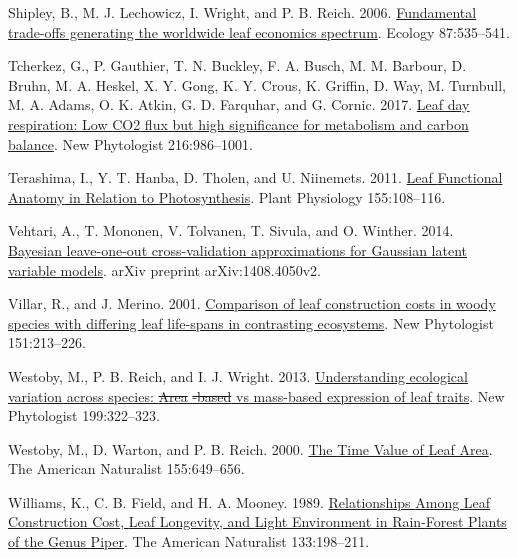 \documentclass[
  12pt,
]{article}
\newlength{\cslhangindent} %
\newlength{\cslentryspacingunit} %
\newenvironment{CSLReferences}[2] %
 {%
  \setlength{\parindent}{0pt} %
  \ifodd #1 %
  \let\oldpar\par %
  \def\par{\hangindent=\cslhangindent\oldpar} %
  \fi %
  \setlength{\parskip}{#2\cslentryspacingunit} %
 }%
 {} %
\providecommand{\DIFaddtex}[1]{{\protect\color{blue}\uwave{#1}}} %
\providecommand{\DIFdeltex}[1]{{\protect\color{red}\sout{#1}}}                      %
\providecommand{\DIFaddbegin}{} %
\providecommand{\DIFaddend}{} %
\providecommand{\DIFdelbegin}{} %
\providecommand{\DIFdelend}{} %
\providecommand{\DIFadd}[1]{\texorpdfstring{\DIFaddtex{#1}}{#1}} %
\providecommand{\DIFdel}[1]{\texorpdfstring{\DIFdeltex{#1}}{}} %
\newcommand{\DIFscaledelfig}{0.5}
\newlength{\DIFdelgraphicswidth} %
\newlength{\DIFdelgraphicsheight} %
\newcommand{\DIFaddincludegraphics}[2][]{{\color{blue}\fbox{\DIFOincludegraphics[#1]{#2}}}} %
\newcommand{\DIFdelincludegraphics}[2][]{%
\sbox{\DIFdelgraphicsbox}{\DIFOincludegraphics[#1]{#2}}%
\settoboxwidth{\DIFdelgraphicswidth}{\DIFdelgraphicsbox} %
\settoboxtotalheight{\DIFdelgraphicsheight}{\DIFdelgraphicsbox} %
\scalebox{\DIFscaledelfig}{%
\parbox[b]{\DIFdelgraphicswidth}{\usebox{\DIFdelgraphicsbox}\\[-\baselineskip] \rule{\DIFdelgraphicswidth}{0em}}\llap{\resizebox{\DIFdelgraphicswidth}{\DIFdelgraphicsheight}{%
\setlength{\unitlength}{\DIFdelgraphicswidth}%
\begin{picture}(1,1)%
\thicklines\linethickness{2pt} %
{\color[rgb]{1,0,0}\put(0,0){\framebox(1,1){}}}%
{\color[rgb]{1,0,0}\put(0,0){\line( 1,1){1}}}%
{\color[rgb]{1,0,0}\put(0,1){\line(1,-1){1}}}%
\end{picture}%
}\hspace*{3pt}}} %
} %
\DeclareRobustCommand{\DIFaddbegin}{\DIFOaddbegin \let\includegraphics\DIFaddincludegraphics} %
\DeclareRobustCommand{\DIFaddend}{\DIFOaddend \let\includegraphics\DIFOincludegraphics} %
\DeclareRobustCommand{\DIFdelbegin}{\DIFOdelbegin \let\includegraphics\DIFdelincludegraphics} %
\DeclareRobustCommand{\DIFdelend}{\DIFOaddend \let\includegraphics\DIFOincludegraphics} %
\begin{document}
\begin{CSLReferences}{1}{0}
\leavevmode{}%
Shipley, B., M. J. Lechowicz, I. Wright, and P. B. Reich. 2006. \href{https://doi.org/10.1890/05-1051}{Fundamental trade-offs generating the worldwide leaf economics spectrum}. Ecology 87:535--541.

\leavevmode{}%
Tcherkez, G., P. Gauthier, T. N. Buckley, F. A. Busch, M. M. Barbour, D. Bruhn, M. A. Heskel, X. Y. Gong, K. Y. Crous, K. Griffin, D. Way, M. Turnbull, M. A. Adams, O. K. Atkin, G. D. Farquhar, and G. Cornic. 2017. \href{https://doi.org/10.1111/nph.14816}{Leaf day respiration: Low {CO2} flux but high significance for metabolism and carbon balance}. New Phytologist 216:986--1001.

\leavevmode{}%
Terashima, I., Y. T. Hanba, D. Tholen, and U. Niinemets. 2011. \href{https://doi.org/10.1104/pp.110.165472}{Leaf {Functional Anatomy} in {Relation} to {Photosynthesis}}. Plant Physiology 155:108--116.

\leavevmode{}%
Vehtari, A., T. Mononen, V. Tolvanen, T. Sivula, and O. Winther. 2014. \href{https://arxiv.org/abs/1408.4050v2}{Bayesian leave-one-out cross-validation approximations for {Gaussian} latent variable models}. arXiv preprint arXiv:1408.4050v2.

\leavevmode{}%
Villar, R., and J. Merino. 2001. \href{https://doi.org/10.1046/j.1469-8137.2001.00147.x}{Comparison of leaf construction costs in woody species with differing leaf life-spans in contrasting ecosystems}. New Phytologist 151:213--226.

\leavevmode{}%
Westoby, M., P. B. Reich, and I. J. Wright. 2013. \href{https://doi.org/10.1111/nph.12345}{Understanding ecological variation across species: \DIFdelbegin %
\DIFdel{Area}%
\DIFdel{-based }\DIFdelend \DIFaddbegin \DIFadd{Area-based }\DIFaddend vs mass-based expression of leaf traits}. New Phytologist 199:322--323.

\leavevmode{}%
Westoby, M., D. Warton, and P. B. Reich. 2000. \href{https://doi.org/10.1086/303346}{The {Time Value} of {Leaf Area}}. The American Naturalist 155:649--656.

\leavevmode{}%
Williams, K., C. B. Field, and H. A. Mooney. 1989. \href{https://doi.org/10.1086/284910}{Relationships {Among Leaf Construction Cost}, {Leaf Longevity}, and {Light Environment} in {Rain}-{Forest Plants} of the {Genus Piper}}. The American Naturalist 133:198--211.


\end{CSLReferences}
\end{document}
